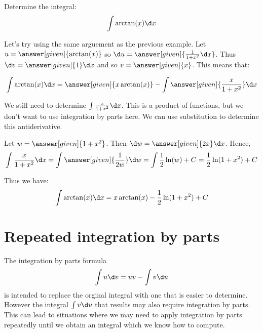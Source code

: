 \documentclass{ximera}
\begin{document}
\begin{example}
Determine the integral:
\[ 
\int \arctan(x) \d x
\]
\begin{explanation}
Let's try using the same arguement as the previous example.  Let $u=\answer[given]{\arctan (x)}$ so $\d u=\answer[given]{\frac{1}{1+x^{2}} \d x}$. Thus $\d v=\answer[given]{1} \d x$ and so $v=\answer[given]{x}$. 
This means that:

\[
\int \arctan(x) \d x= \answer[given]{x\arctan(x)}- \int \answer[given]{\frac{x}{1+x^{2}}} \d x
\]

We still need to determine $\int \frac{x}{1+x^{2}} \d x$. This is a product of functions, but we don't want to use integration by parts here.  We can use substitution to determine this antiderivative. 

Let $w=\answer[given]{1+x^{2}}$. Then $\d w=\answer[given]{2 x} \d x$. Hence, 
\[
\int \frac{x}{1+x^{2}} \d x= \int \answer[given]{\frac{1}{2 w}} \d w \\
 = \int \frac{1}{2} \ln(w) + C=\frac{1}{2} \ln(1+x^{2})+C \\
\]

Thus we have:
\[ 
\int \arctan(x) \d x = x \arctan(x) -\frac{1}{2} \ln(1+x^{2}) +C
\]
\end{explanation}
\end{example}






\section{Repeated integration by parts}

The  integration by parts formula
 \[
\int u \d v= uv - \int v \d u
\]
 is intended to replace the orginal integral with one that is easier to determine. However the integral $\int v \d u$ that results may also require integration by parts. This can lead to situations where we may need to apply integration by parts repeatedly until we obtain an integral which we know how to compute. 


%
\end{document}
